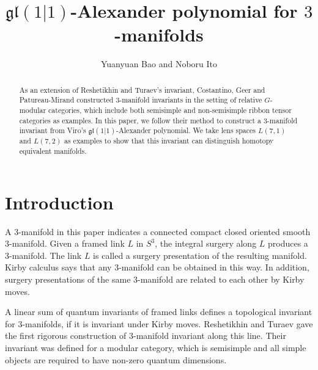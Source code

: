 \documentclass[12pt]{amsart}
\begin{document}
\title[$\mathfrak{gl}(1 \vert 1)$-Alexander polynomial for $3$-manifolds]{$\mathfrak{gl}(1 \vert 1)$-Alexander polynomial for $3$-manifolds}
\author{Yuanyuan Bao and Noboru Ito}

\address{
Graduate School of Mathematical Sciences, University of Tokyo, 3-8-1 Komaba, Tokyo 153-8914, Japan
}

\address{National Institute of Technology, Ibaraki College, 866 Nakane, Hitachinaka, Ibaraki, 312-8508, Japan
}





\maketitle

\begin{abstract}
As an extension of Reshetikhin and Turaev's invariant, Costantino, Geer and Patureau-Mirand constructed $3$-manifold invariants in the setting of relative $G$-modular categories, which include both semisimple and non-semisimple ribbon tensor categories as examples. In this paper, we follow their method to construct a $3$-manifold invariant from Viro's $\mathfrak{gl}(1\vert 1)$-Alexander polynomial. 
We take lens spaces $L(7, 1)$ and $L(7, 2)$ as examples to show that this invariant can distinguish homotopy equivalent manifolds.
\end{abstract}

\section{Introduction}

A $3$-manifold in this paper indicates a connected compact closed oriented smooth $3$-manifold. Given a framed link $L$ in $S^3$, the integral surgery along $L$ produces a $3$-manifold. The link $L$ is called a surgery presentation of the resulting manifold. Kirby calculus \cite{MR467753} says that any $3$-manifold can be obtained in this way. In addition, surgery presentations of the same $3$-manifold are related to each other by Kirby moves. 

A linear sum of quantum invariants of framed links defines a topological invariant for $3$-manifolds, if it is invariant under Kirby moves. Reshetikhin and Turaev \cite{MR1091619} gave the first rigorous construction of $3$-manifold invariant along this line. Their invariant was defined for a modular category, which is semisimple and all simple objects are required to have non-zero quantum dimensions. 
\end{document}
